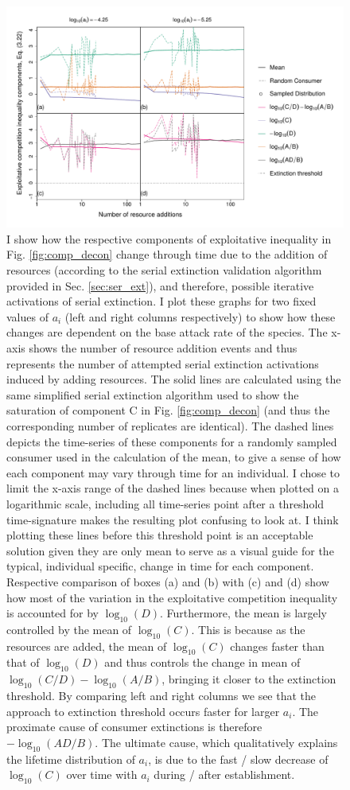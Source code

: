 \documentclass[a4paper]{report}
\DeclareMathOperator{\log}{log}
\begin{document}
{%
\begin{figure}[H]
\centering{}
\includegraphics[scale=0.6]{../Images/variation.pdf}
\caption{I show how the respective components of exploitative inequality in Fig. \ref{fig:comp_decon} change through time due to the addition of resources (according to the serial extinction validation algorithm provided in Sec. \ref{sec:ser_ext}), and therefore, possible iterative activations of serial extinction. I plot these graphs for two fixed values of $a_i$ (left and right columns respectively) to show how these changes are dependent on the base attack rate of the species. The x-axis shows the number of resource addition events and thus represents the number of attempted serial extinction activations induced by adding resources. The solid lines are calculated using the same simplified serial extinction algorithm used to show the saturation of component C in Fig. \ref{fig:comp_decon} (and thus the corresponding number of replicates are identical). The dashed lines depicts the time-series of these components for a randomly sampled consumer used in the calculation of the mean, to give a sense of how each component may vary through time for an individual. I chose to limit the x-axis range of the dashed lines because when plotted on a logarithmic scale, including all time-series point after a threshold time-signature makes the resulting plot confusing to look at. I think plotting these lines before this threshold point is an acceptable solution given they are only mean to serve as a visual guide for the typical, individual specific, change in time for each component. Respective comparison of boxes (a) and (b) with (c) and (d) show how most of the variation in the exploitative competition inequality is accounted for by $\log_{10}(D)$. Furthermore, the mean is largely controlled by the mean of $\log_{10}(C)$. This is because as the resources are added, the mean of $\log_{10}(C)$ changes faster than that of $\log_{10}(D)$ and thus controls the change in mean of $\log_{10}(C/D)-\log_{10}(A/B)$, bringing it closer to the extinction threshold. By comparing left and right columns we see that the approach to extinction threshold occurs faster for larger $a_i$. The proximate cause of consumer extinctions is therefore $-\log_{10}(AD/B)$. The ultimate cause, which qualitatively explains the lifetime distribution of $a_i$, is due to the fast / slow decrease of $\log_{10}(C)$ over time with $a_i$ during / after establishment.
}
\end{figure}}
\end{document}
